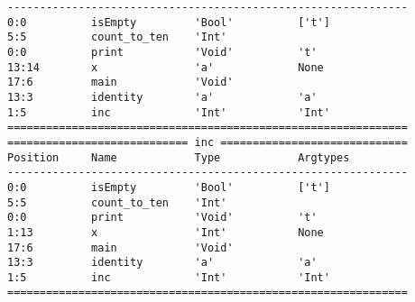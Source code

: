 \documentclass[a4paper]{article}
\begin{document}
\begin{verbatim}
--------------------------------------------------------------
0:0          isEmpty         'Bool'          ['t']               
5:5          count_to_ten    'Int'                               
0:0          print           'Void'          't'                 
13:14        x               'a'             None                
17:6         main            'Void'                              
13:3         identity        'a'             'a'                 
1:5          inc             'Int'           'Int'               
==============================================================
============================ inc =============================
Position     Name            Type            Argtypes            
--------------------------------------------------------------
0:0          isEmpty         'Bool'          ['t']               
5:5          count_to_ten    'Int'                               
0:0          print           'Void'          't'                 
1:13         x               'Int'           None                
17:6         main            'Void'                              
13:3         identity        'a'             'a'                 
1:5          inc             'Int'           'Int'               
==============================================================

\end{verbatim}
\end{document}
